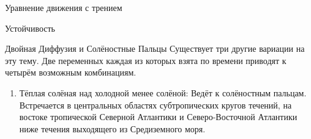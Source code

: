 \begin{chapter}{Уравнение движения с трением}
\begin{section}{Устойчивость}
\begin{paragraph}{Двойная Диффузия и Солёностные Пальцы}
Существует три другие вариации на эту тему. Две переменных каждая из
которых взята по времени приводят к четырём возможным комбинациям.
%
\begin{enumerate}
\item
Тёплая солёная над холодной менее солёной: Ведёт к солёностным
пальцам. Встречается в центральных областях субтропических кругов
течений, на востоке тропической Северной Атлантики и Северо-Восточной
Атлантики ниже течения выходящего из Средиземного моря.
%


\end{enumerate}
\end{paragraph}
\end{section}
\end{chapter}
